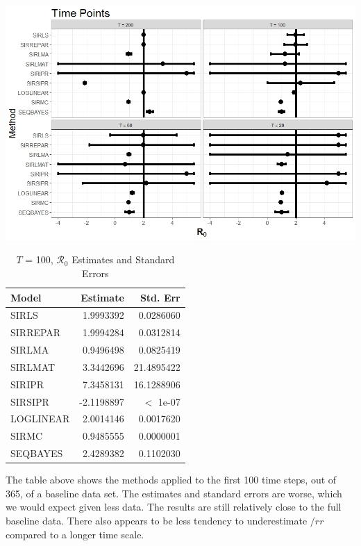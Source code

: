 \message{ !name(draft_v13.tex)}\documentclass[12pt]{article}
\newcommand{\rr}{\ensuremath{\mathcal{R}_0}}
\begin{document}
\includegraphics[scale=0.5]{images/time.jpeg}

\begin{table}[H]
	
	\caption{\label{tab:} $T$ = 100, $\rr$ Estimates and Standard Errors}
	\centering
	\begin{tabular}[t]{l|r|r}
		\hline
		Model & Estimate & Std. Err\\
		\hline
		SIRLS & 1.9993392 & 0.0286060\\
		\hline
		SIRREPAR & 1.9994284 & 0.0312814\\
		\hline
		SIRLMA & 0.9496498 & 0.0825419\\
		\hline
		SIRLMAT & 3.3442696 & 21.4895422\\
		\hline
		SIRIPR & 7.3458131 & 16.1288906\\
		\hline
		SIRSIPR & -2.1198897 & $<$ 1e-07\\
		\hline
		LOGLINEAR & 2.0014146 & 0.0017620\\
		\hline
		SIRMC & 0.9485555 & 0.0000001\\
		\hline
		SEQBAYES & 2.4289382 & 0.1102030\\
		\hline
	\end{tabular}
\end{table}

The table above shows the methods applied to the first 100 time steps, out of 365, of a baseline data set. The estimates and standard errors are worse, which we would expect given less data. The results are still relatively close to the full baseline data. There also appears to be less tendency to underestimate $/rr$ compared to a longer time scale.
\end{document}
